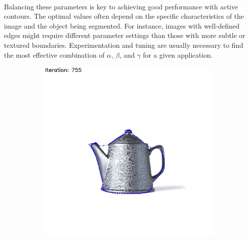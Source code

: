 \documentclass[12pt,a4paper]{report}
\begin{document}
\paragraph*{}
Balancing these parameters is key to achieving good performance with active contours. The optimal values often depend on the specific characteristics of the image and the object being segmented. For instance, images with well-defined edges might require different parameter settings than those with more subtle or textured boundaries. Experimentation and tuning are usually necessary to find the most effective combination of \(\alpha\), \(\beta\), and \(\gamma\) for a given application.
\begin{figure}[!]
    \begin{minipage}{\linewidth}
        \centering
        \begin{subfigure}{0.49\textwidth}
              \includegraphics[width=\linewidth]{result_img/beta_0_01.jpg}
        \end{subfigure}
        \begin{subfigure}{0.49\textwidth}

\end{subfigure}
\end{minipage}
\end{figure}
\end{document}
